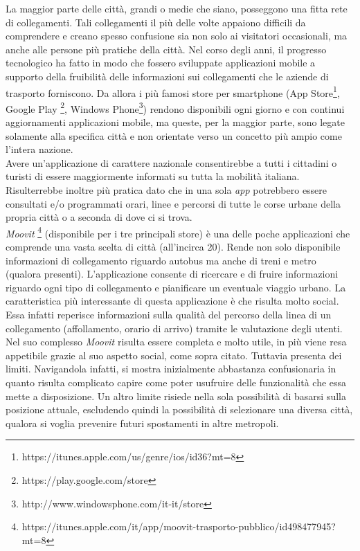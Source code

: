La maggior parte delle citt\`{a}, grandi o medie che siano, posseggono una fitta rete di collegamenti. Tali collegamenti il più delle volte appaiono difficili da comprendere e creano spesso confusione sia non solo ai visitatori occasionali, ma anche alle persone più pratiche della citt\`{a}. Nel corso degli anni, il progresso tecnologico ha fatto in modo che fossero sviluppate applicazioni mobile a supporto della fruibilit\`{a} delle informazioni sui collegamenti che le aziende di trasporto forniscono. 
Da allora i più famosi store per smartphone (App Store\footnote{https://itunes.apple.com/us/genre/ios/id36?mt=8}, Google Play \footnote{https://play.google.com/store}, Windows Phone\footnote{http://www.windowsphone.com/it-it/store}) rendono disponibili ogni giorno e con continui aggiornamenti applicazioni mobile, ma queste, per la maggior parte, sono legate solamente alla specifica città e non orientate verso un concetto più ampio come l’intera nazione.\\ 
Avere un’applicazione di carattere nazionale consentirebbe a tutti i cittadini o turisti di essere maggiormente informati su tutta la mobilit\`{a} italiana. Risulterrebbe inoltre pi\`{u} pratica dato che in una sola \emph{app} potrebbero essere consultati e/o programmati orari, linee e percorsi di tutte le corse urbane della propria città o a seconda di dove ci si trova.\\
\emph{Moovit} \footnote{https://itunes.apple.com/it/app/moovit-trasporto-pubblico/id498477945?mt=8} (disponibile per i tre principali store) è una delle poche applicazioni che comprende una vasta scelta di città (all'incirca 20). Rende non solo disponibile informazioni di collegamento riguardo autobus ma anche di treni e metro (qualora presenti). L'applicazione consente di ricercare e di fruire informazioni riguardo ogni tipo di collegamento e pianificare un eventuale viaggio urbano. 
La caratteristica più interessante di questa applicazione è che risulta molto social. Essa infatti reperisce informazioni sulla qualità del percorso della linea di un collegamento (affollamento, orario di arrivo) tramite le valutazione degli utenti. 
Nel suo complesso \emph{Moovit} risulta essere completa e molto utile, in più viene resa appetibile grazie al suo aspetto social, come sopra citato. Tuttavia presenta dei limiti. Navigandola infatti, si mostra inizialmente abbastanza confusionaria in quanto risulta complicato capire come poter usufruire delle funzionalità che essa mette a disposizione. Un altro limite risiede nella sola possibilità di basarsi sulla posizione attuale, escludendo quindi la possibilità di selezionare una diversa città, qualora si voglia prevenire futuri spostamenti in altre metropoli.
